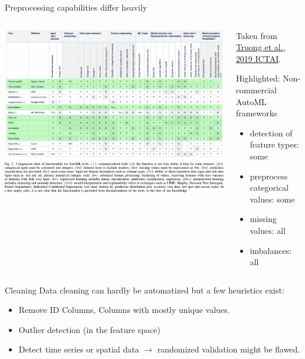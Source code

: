 \begin{frame}{Preprocessing capabilities differ heavily}
  \begin{columns}
    \begin{column}{0.6\textwidth}
      \vspace*{-1cm}
      \begin{center}
        \includegraphics[width = \linewidth]{images/Truong2019Towards_fig2.pdf}
      \end{center}
    \end{column}%
    \begin{column}{0.3\textwidth}
    \small
      Taken from \href{https://doi.org/10.1109/ICTAI.2019.00209}{Truong et al., 2019 ICTAI}.
      \vspace{1em}

      Highlighted: Non-commercial AutoML frameworks

      \begin{itemize}
        \item detection of feature types: some
        \item preprocess categorical values: some
        \item missing values: all
        \item imbalances: all
      \end{itemize}
    \end{column}
  \end{columns}
\end{frame}

\begin{frame}{Cleaning}
  Data cleaning can hardly be automatized but a few heuristics exist:
  \begin{itemize}
    \item Remove ID Columns, Columns with mostly unique values.
    \item Outlier detection (in the feature space)
    \item Detect time series or spatial data $\rightarrow$ randomized validation might be flawed.
  \end{itemize}
\end{frame}

